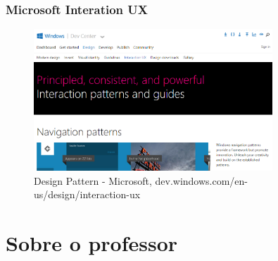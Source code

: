 \documentclass[presentation]{beamer}
\begin{document}
\begin{frame}[c]\frametitle{Microsoft Interation UX}
    
\begin{figure}[tb]
    \begin{center}
        \includegraphics[width=0.8\textwidth]{img/windows-interation-ux.png}
    \end{center}
    \caption{Design Pattern - Microsoft, dev.windows.com/en-us/design/interaction-ux}
    \label{fig:microsoft-interaction-ux}
\end{figure}
\end{frame}

\section{Sobre o professor}
\end{document}
